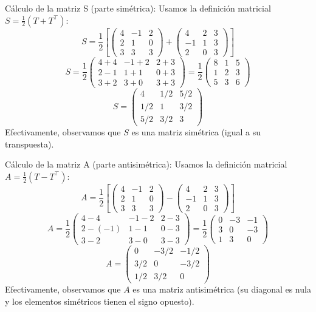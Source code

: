 \documentclass[11pt,spanish]{article}
\begin{document}
\begin{itemize}
Cálculo de la matriz S (parte simétrica):
Usamos la definición matricial $S = \frac{1}{2}(T + T^\top)$:
$$
S = \frac{1}{2} \left[ \begin{pmatrix} 4 & -1 & 2 \\ 2 & 1 & 0 \\ 3 & 3 & 3 \end{pmatrix} + \begin{pmatrix} 4 & 2 & 3 \\ -1 & 1 & 3 \\ 2 & 0 & 3 \end{pmatrix} \right]
$$
$$
S = \frac{1}{2} \begin{pmatrix} 4+4 & -1+2 & 2+3 \\ 2-1 & 1+1 & 0+3 \\ 3+2 & 3+0 & 3+3 \end{pmatrix}
= \frac{1}{2} \begin{pmatrix} 8 & 1 & 5 \\ 1 & 2 & 3 \\ 5 & 3 & 6 \end{pmatrix}
$$
$$
S = \begin{pmatrix} 4 & 1/2 & 5/2 \\ 1/2 & 1 & 3/2 \\ 5/2 & 3/2 & 3 \end{pmatrix}
$$
Efectivamente, observamos que $S$ es una matriz simétrica (igual a su transpuesta).

Cálculo de la matriz A (parte antisimétrica):
Usamos la definición matricial $A = \frac{1}{2}(T - T^\top)$:
$$
A = \frac{1}{2} \left[ \begin{pmatrix} 4 & -1 & 2 \\ 2 & 1 & 0 \\ 3 & 3 & 3 \end{pmatrix} - \begin{pmatrix} 4 & 2 & 3 \\ -1 & 1 & 3 \\ 2 & 0 & 3 \end{pmatrix} \right]
$$
$$
A = \frac{1}{2} \begin{pmatrix} 4-4 & -1-2 & 2-3 \\ 2-(-1) & 1-1 & 0-3 \\ 3-2 & 3-0 & 3-3 \end{pmatrix}
= \frac{1}{2} \begin{pmatrix} 0 & -3 & -1 \\ 3 & 0 & -3 \\ 1 & 3 & 0 \end{pmatrix}
$$
$$
A = \begin{pmatrix} 0 & -3/2 & -1/2 \\ 3/2 & 0 & -3/2 \\ 1/2 & 3/2 & 0 \end{pmatrix}
$$
Efectivamente, observamos que $A$ es una matriz antisimétrica (su diagonal es nula y los elementos simétricos tienen el signo opuesto).


\end{itemize}
\end{document}
